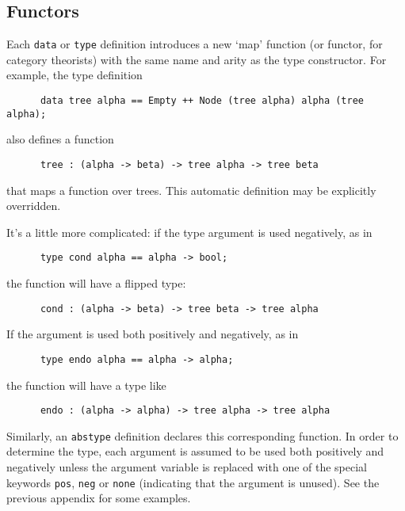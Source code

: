 \documentclass[11pt]{article}
\newcommand{\Samp}[1]{\textup{\textmd{\texttt{#1}}}}
\newcommand{\SubSection}[2]{\subsection{#2}\label{sec:#1}}
\begin{document}
\SubSection{functors}{Functors}

Each \Samp{data} or \Samp{type} definition introduces a new `map' function
(or functor, for category theorists)
with the same name and arity as the type constructor.
For example, the type definition
\begin{verbatim}
      data tree alpha == Empty ++ Node (tree alpha) alpha (tree alpha);
\end{verbatim}
also defines a function
\begin{verbatim}
      tree : (alpha -> beta) -> tree alpha -> tree beta
\end{verbatim}
that maps a function over trees.
This automatic definition may be explicitly overridden.

It's a little more complicated:
if the type argument is used negatively, as in
\begin{verbatim}
      type cond alpha == alpha -> bool;
\end{verbatim}
the function will have a flipped type:
\begin{verbatim}
      cond : (alpha -> beta) -> tree beta -> tree alpha
\end{verbatim}
If the argument is used both positively and negatively, as in
\begin{verbatim}
      type endo alpha == alpha -> alpha;
\end{verbatim}
the function will have a type like
\begin{verbatim}
      endo : (alpha -> alpha) -> tree alpha -> tree alpha
\end{verbatim}
Similarly, an \Samp{abstype} definition declares this corresponding function.
In order to determine the type,
each argument is assumed to be used both positively and negatively
unless the argument variable is replaced with one of the special keywords
\Samp{pos}, \Samp{neg} or \Samp{none} (indicating that the argument is unused).
See the previous appendix for some examples.
\end{document}
